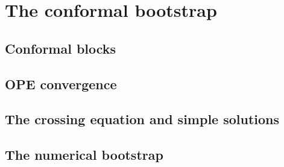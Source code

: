 \documentclass[a4paper,12pt]{article}
\numberwithin{equation}{section}
\begin{document}

\section{The conformal bootstrap}
\label{sec:bootstrap}

%
%
%
%
%
%
%


\subsection{Conformal blocks}

%
%
%
%


\subsection{OPE convergence}


\subsection{The crossing equation and simple solutions}


%
%





\subsection{The numerical bootstrap}

%
%
%
%

%
%
%
%
%
%
%
\end{document}
